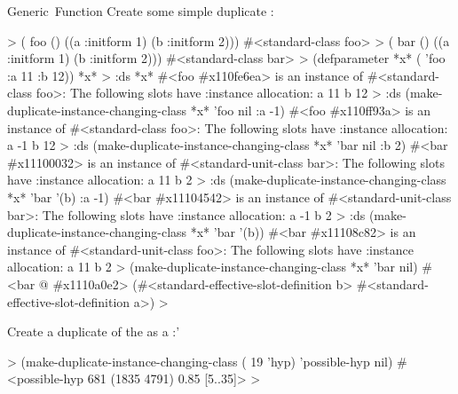 \documentclass[10pt,twoside,english,pdftex]{article}
\begin{document}
\begin{functiondoc}{Generic~Function}
\fnexamples
Create some simple duplicate :
%
%
%
%
%
\W\supp
\begin{example}
  > ( foo () 
       ((a :initform 1)
        (b :initform 2)))
  #<standard-class foo>
  > ( bar () 
       ((a :initform 1)
        (b :initform 2)))
  #<standard-class bar>
  > (defparameter *x* ( 'foo :a 11 :b 12))
  *x*
  > :ds *x*
  #<foo #x110fe6ea> is an instance of #<standard-class foo>:
   The following slots have :instance allocation:
    a   11
    b   12
  > :ds (make-duplicate-instance-changing-class *x* 'foo nil :a -1)
  #<foo #x110ff93a> is an instance of #<standard-class foo>:
   The following slots have :instance allocation:
    a   -1
    b   12\goodpagebreak
  > :ds (make-duplicate-instance-changing-class *x* 'bar nil :b 2)
  #<bar #x11100032> is an instance of #<standard-unit-class bar>:
   The following slots have :instance allocation:
    a   11
    b   2\goodpagebreak
  > :ds (make-duplicate-instance-changing-class *x* 'bar '(b) :a -1)
  #<bar #x11104542> is an instance of #<standard-unit-class bar>:
   The following slots have :instance allocation:
    a   -1
    b   2
  > :ds (make-duplicate-instance-changing-class *x* 'bar '(b))
  #<bar #x11108c82> is an instance of #<standard-unit-class foo>:
   The following slots have :instance allocation:
    a   11
    b   2
  > (make-duplicate-instance-changing-class *x* 'bar nil)
  #<bar @ #x1110a0e2>
  (#<standard-effective-slot-definition b>
   #<standard-effective-slot-definition a>)
  >
\end{example}

%
Create a duplicate of the    as a 
:'
%
\W\supp
\begin{example}
  > (make-duplicate-instance-changing-class 
      ( 19 'hyp)
      'possible-hyp nil)
  #<possible-hyp 681 (1835 4791) 0.85 [5..35]>
  >
\end{example}

\end{functiondoc}

\end{document}
